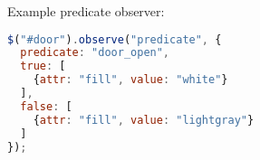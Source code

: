 
Example predicate observer:

\begin{lstlisting}[language=JavaScript]
$("#door").observe("predicate", {
  predicate: "door_open",
  true: [
    {attr: "fill", value: "white"}
  ],
  false: [
    {attr: "fill", value: "lightgray"}
  ]
});
\end{lstlisting}

%
%
%
%

